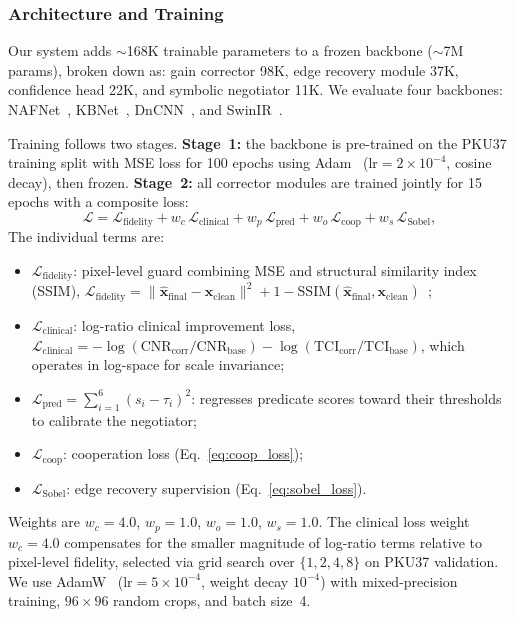 \documentclass{ieeetj}
\begin{document}
\subsubsection{Architecture and Training}
Our system adds ${\sim}$168K trainable parameters to a frozen backbone (${\sim}$7M params), broken down as: gain corrector 98K, edge recovery module 37K, confidence head 22K, and symbolic negotiator 11K. We evaluate four backbones: NAFNet~\cite{chen2022simple}, KBNet~\cite{zhang2023kbnet}, DnCNN~\cite{zhang2017beyond}, and SwinIR~\cite{liang2021swinir}.

Training follows two stages. \textbf{Stage~1:} the backbone is pre-trained on the PKU37 training split with MSE loss for 100 epochs using Adam~\cite{kingma2015adam} ($\text{lr} = 2\!\times\!10^{-4}$, cosine decay), then frozen. \textbf{Stage~2:} all corrector modules are trained jointly for 15 epochs with a composite loss:
\begin{equation}
\mathcal{L} = \mathcal{L}_\text{fidelity} + w_c\,\mathcal{L}_\text{clinical} + w_p\,\mathcal{L}_\text{pred} + w_o\,\mathcal{L}_\text{coop} + w_s\,\mathcal{L}_\text{Sobel},
\label{eq:total_loss}
\end{equation}
The individual terms are:
\begin{itemize}
\item $\mathcal{L}_\text{fidelity}$: pixel-level guard combining MSE and structural similarity index (SSIM), $\mathcal{L}_\text{fidelity} = \|\hat{\mathbf{x}}_\text{final} - \mathbf{x}_\text{clean}\|^2 + 1 - \text{SSIM}(\hat{\mathbf{x}}_\text{final}, \mathbf{x}_\text{clean})$~\cite{wang2004image};
\item $\mathcal{L}_\text{clinical}$: log-ratio clinical improvement loss, $\mathcal{L}_\text{clinical} = -\log(\text{CNR}_\text{corr}/\text{CNR}_\text{base}) - \log(\text{TCI}_\text{corr}/\text{TCI}_\text{base})$, which operates in log-space for scale invariance;
\item $\mathcal{L}_\text{pred} = \sum_{i=1}^{6}(s_i - \tau_i)^2$: regresses predicate scores toward their thresholds to calibrate the negotiator;
\item $\mathcal{L}_\text{coop}$: cooperation loss (Eq.~\eqref{eq:coop_loss});
\item $\mathcal{L}_\text{Sobel}$: edge recovery supervision (Eq.~\eqref{eq:sobel_loss}).
\end{itemize}
Weights are $w_c = 4.0$, $w_p = 1.0$, $w_o = 1.0$, $w_s = 1.0$. The clinical loss weight $w_c = 4.0$ compensates for the smaller magnitude of log-ratio terms relative to pixel-level fidelity, selected via grid search over $\{1, 2, 4, 8\}$ on PKU37 validation. We use AdamW~\cite{loshchilov2019decoupled} ($\text{lr} = 5\!\times\!10^{-4}$, weight decay $10^{-4}$) with mixed-precision training, $96\times 96$ random crops, and batch size~4.
\end{document}
